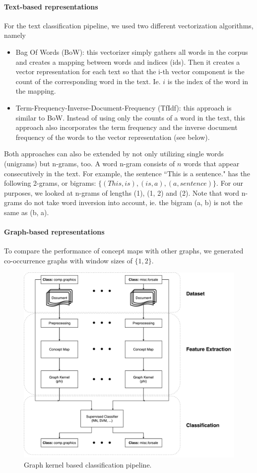 \paragraph{Text-based representations}
For the text classification pipeline, we used two different vectorization algorithms, namely
\begin{itemize}
\item{Bag Of Words (BoW): this vectorizer simply gathers all words in the corpus and creates a mapping between words and indices (ids). Then it creates a vector representation for each text so that the i-th vector component  is the count of the corresponding word in the text. Ie. $i$ is the index of the word in the mapping.}
\item{Term-Frequency-Inverse-Document-Frequency (TfIdf): this approach is similar to BoW. Instead of using only the counts of a word in the text, this approach also incorporates the term frequency and the inverse document frequency of the words to the vector representation (see below).}
\end{itemize}
Both approaches can also be extended by not only utilizing single words (unigrams) but n-grams, too. A word n-gram consists of $n$ words that appear consecutively in the text.
For example, the sentence ``This is a sentence." has the following 2-grams, or bigrams: $\{ (This, is), (is, a), (a, sentence) \}$.
For our purposes, we looked at n-grams of lengths (1), (1, 2) and (2).
Note that word n-grams do not take word inversion into account, ie. the bigram (a, b) is not the same as (b, a).


\paragraph{Graph-based representations}
To compare the performance of concept maps with other graphs, we generated co-occurrence graphs with window sizes of $\{1, 2\}$.


\begin{figure}[ht]
\centering\includegraphics[width=0.6\linewidth]{assets/figures/approach.pdf}
\caption{Graph kernel based classification pipeline.}
\end{figure}

